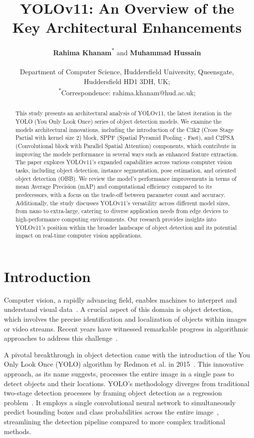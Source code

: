 \documentclass{article}
\title{YOLOv11: An Overview of the Key Architectural Enhancements}
\author{
  \textbf{Rahima Khanam}\textsuperscript{*} and \textbf{Muhammad Hussain}\\[1ex] %
  \begin{minipage}[t]{0.90\textwidth}
    \scriptsize Department of Computer Science, Huddersfield University, Queensgate, Huddersfield HD1 3DH, UK; \\
    \textsuperscript{*}Correspondence: rahima.khanam@hud.ac.uk;
  \end{minipage}
}
\begin{document}
\maketitle
\begin{abstract}
This study presents an architectural analysis of YOLOv11, the latest iteration in the YOLO (You Only Look Once) series of object detection models. We examine the models architectural innovations, including the introduction of the C3k2 (Cross Stage Partial with kernel size 2) block, SPPF (Spatial Pyramid Pooling - Fast), and C2PSA (Convolutional block with Parallel Spatial Attention) components, which contribute in improving the models performance in several ways such as enhanced feature extraction. The paper explores YOLOv11's expanded capabilities across various computer vision tasks, including object detection, instance segmentation, pose estimation, and oriented object detection (OBB). We review the model's performance improvements in terms of mean Average Precision (mAP) and computational efficiency compared to its predecessors, with a focus on the trade-off between parameter count and accuracy. Additionally, the study discusses YOLOv11's versatility across different model sizes, from nano to extra-large, catering to diverse application needs from edge devices to high-performance computing environments. Our research provides insights into YOLOv11's position within the broader landscape of object detection and its potential impact on real-time computer vision applications.
\end{abstract}



\section{Introduction}

Computer vision, a rapidly advancing field, enables machines to interpret and understand visual data~\cite{sonka2013image}. A crucial aspect of this domain is object detection\cite{zou2023object}, which involves the precise identification and localization of objects within images or video streams\cite{zhao2019object}. Recent years have witnessed remarkable progress in algorithmic approaches to address this challenge~\cite{hussain2024depth}.

A pivotal breakthrough in object detection came with the introduction of the You Only Look Once (YOLO) algorithm by Redmon et al. in 2015~\cite{redmon2016you}. This innovative approach, as its name suggests, processes the entire image in a single pass to detect objects and their locations. YOLO's methodology diverges from traditional two-stage detection processes by framing object detection as a regression problem~\cite{redmon2016you}. It employs a single convolutional neural network to simultaneously predict bounding boxes and class probabilities across the entire image~\cite{du2018understanding}, streamlining the detection pipeline compared to more complex traditional methods.
\end{document}
